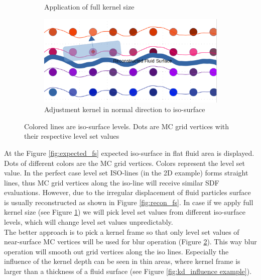 \begin{figure}[H]
\begin{subfigure}[b]{0.5\textwidth}
               \caption{Application of full kernel size}
               \label{fig:full_ks}
        \end{subfigure}
        \begin{subfigure}[b]{0.5\textwidth}
               \includegraphics[width=\textwidth]{figures/LevelSetBlurKernelPart.png}
               \caption{Adjustment kernel in normal direction to iso-surface}
				\label{fig:partial_ks}
        \end{subfigure}

       \caption{Colored lines are iso-surface levels. Dots are MC grid vertices with their respective level set values}
       \label{fig:kd_surface_explenation}
 \end{figure}
At the Figure \ref{fig:expected_fs} expected iso-surface in flat fluid area is displayed. Dots of different colors are the MC grid vertices. Colors represent the level set value. In the perfect case level set ISO-lines (in the 2D example) forms straight lines, thus MC grid vertices along the iso-line will receive similar SDF evaluations. However, due to the irregular displacement of fluid particles surface is usually reconstructed as shown in Figure \ref{fig:recon_fs}. In case if we apply full kernel size (see Figure \ref{fig:full_ks}) we will pick level set values from different iso-surface levels, which will change level set values unpredictably.\\
The better approach is to pick a kernel frame so that only level set values of near-surface MC vertices will be used for blur operation (Figure \ref{fig:partial_ks}). This way blur operation will smooth out grid vertices along the iso lines. Especially the influence of the kernel depth can be seen in thin areas, where kernel frame is larger than a thickness of a fluid surface (see Figure \ref{fig:kd_influence example}).
